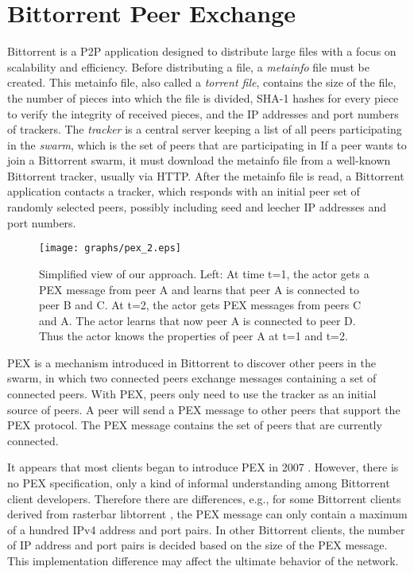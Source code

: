 \documentclass[paper]{ieice}
\begin{document}
\section{Bittorrent Peer Exchange}\label{background}
Bittorrent is a P2P application designed to distribute large files with a focus on scalability and efficiency.  
Before distributing a file, a \textit{metainfo} file must be created.  
This metainfo file, also called a \textit{torrent file}, contains the size of the file, the number of pieces into which the file is divided, SHA-1 hashes for every piece to verify the integrity of received pieces, and the IP addresses and port numbers of trackers.  
The \textit{tracker} is a central server keeping a list of all peers participating in the \textit{swarm}, which is the set of peers that are participating in %
If a peer wants to join a Bittorrent swarm, it must download the metainfo file from a well-known Bittorrent tracker, usually via HTTP. 
After the metainfo file is read, a Bittorrent application contacts a tracker, which responds with an initial peer set of randomly selected peers, possibly including seed and leecher IP addresses and port numbers.  

\begin{figure}[tb]
\begin{center}
\texttt{[image: graphs/pex\_2.eps]}
\end{center}
\caption{Simplified view of our approach. Left: At time t=1, the actor gets a PEX message from peer A and
learns that peer A is connected to peer B and C. At t=2, the actor gets  PEX messages from peers C and A. The actor
learns that now peer A is connected to peer D. Thus the actor knows the properties of peer A at t=1 and t=2.} 
\label{fig:pexworks}
\vspace{-5mm}
\end{figure}

PEX is a mechanism introduced in Bittorrent to discover other peers in the swarm, in which two connected peers exchange messages containing a set of connected peers.  
With PEX, peers only need to use the tracker as an initial source of peers.   
A peer will send a PEX message to other peers that support the PEX protocol. 
The PEX message contains the set of peers that are currently connected.

It appears that most clients began to introduce PEX in 2007  \cite{client}. 
However, there is no PEX specification, only a kind of informal understanding among Bittorrent client developers.
Therefore there are differences, e.g., for some Bittorrent clients derived from rasterbar libtorrent \cite{rasterbar}, the PEX message can only contain a maximum of a hundred IPv4 address and port pairs. 
In other Bittorrent clients, the number of IP address and port pairs is decided based on the size of the PEX message.  
This implementation difference may affect the ultimate behavior of the network.
\end{document}

